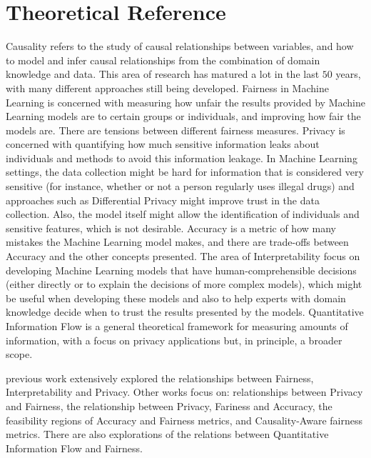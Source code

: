 \documentclass[12pt]{article}
\begin{document}
\section{Theoretical Reference}

Causality refers to the study of causal relationships between variables, and how to model and infer causal relationships from the combination of domain knowledge and data\cite{Causality}. This area of research has matured a lot in the last $50$ years, with many different approaches still being developed. Fairness in Machine Learning is concerned with measuring how unfair the results provided by Machine Learning models are to certain groups or individuals\cite{FairMeasures}, and improving how fair the models are\cite{FairSolve}. There are tensions between different fairness measures\cite{Impossibility}\cite{FairTensions}. Privacy is concerned with quantifying how much sensitive information leaks about individuals and methods to avoid this information leakage. In Machine Learning settings, the data collection might be hard for information that is considered very sensitive (for instance, whether or not a person regularly uses illegal drugs) and approaches such as Differential Privacy\cite{DP} might improve trust in the data collection. Also, the model itself might allow the identification of individuals and sensitive features, which is not desirable\cite{liu2021machine}. Accuracy is a metric of how many mistakes the Machine Learning model makes, and there are trade-offs between Accuracy and the other concepts presented\cite{Sok}\cite{Carlos}\cite{Rachel}. The area of Interpretability focus on developing Machine Learning models that have human-comprehensible decisions (either directly or to explain the decisions of more complex models), which might be useful when developing these models\cite{ExplDev} and also to help experts with domain knowledge decide when to trust the results presented by the models\cite{ExplainExperts}. Quantitative Information Flow is a general theoretical framework for measuring amounts of information, with a focus on privacy applications but, in principle, a broader scope\cite{QIF}.

previous work extensively explored the relationships between Fairness, Interpretability and Privacy\cite{Sok}. Other works focus on: relationships between Privacy and Fairness\cite{Awareness}, the relationship between Privacy, Fariness and Accuracy\cite{Rachel}, the feasibility regions of Accuracy and Fairness metrics\cite{Carlos}\cite{Reductions}, and Causality-Aware fairness metrics\cite{CausalFair}. There are also explorations of the relations between Quantitative Information Flow and Fairness\cite{Bruno}.
\end{document}
